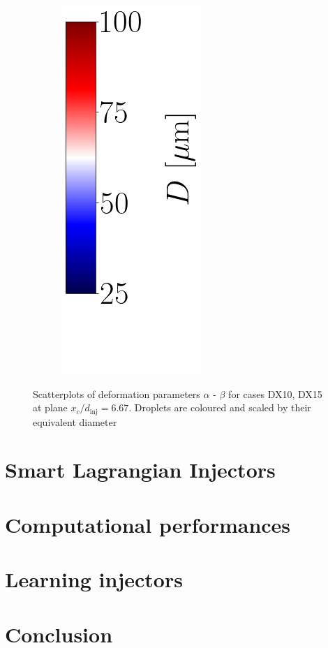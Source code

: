 \begin{figure}[ht]
\begin{subfigure}[b]{0.4\textwidth}
\end{subfigure}
\begin{subfigure}[b]{0.1\textwidth}
	\centering
	\hspace*{0.35in}
   \includegraphics[scale=0.5]{./part3_applications/figures_ch8_resolved/SPRAY_characterization/deformation/scatterplots_colorbar_D_with_blank_space.png}
\end{subfigure}
   \caption[Scatterplots of deformation parameters $\alpha$ - $\beta$ for cases DX10, DX15 at plane $x_c/d_\mathrm{inj} = 6.67$ ]{Scatterplots of deformation parameters $\alpha$ - $\beta$ for cases DX10, DX15 at plane $x_c/d_\mathrm{inj} = 6.67$. Droplets are coloured and scaled by their equivalent diameter}
\label{fig:ch8_jicf_global_scatterplots_deformation}
\end{figure}


\section{Smart Lagrangian Injectors}
\label{sec:ch8_learning_SLI_in_BIMER}



\section{Computational performances}


\section{Learning injectors}




\section{Conclusion}
